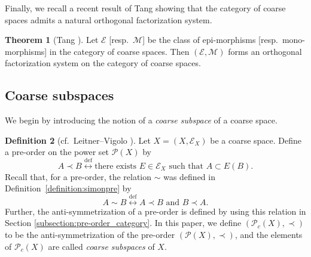 \documentclass[12pt, a4paper]{amsart}
\theoremstyle{definition}
\newtheorem{theorem}{Theorem}[section]
\newtheorem{definition}[theorem]{Definition}
\newcommand{\defarrow}{\mathrel{\stackrel{\mathrm{def}}{\longleftrightarrow}}}
\begin{document}
Finally, we recall a recent result of Tang showing that the category of
coarse spaces admits a natural orthogonal factorization system.

\begin{theorem}[Tang {\cite[Theorem 1.8]{Tang2024categorical}}]\label{theorem:EM_coarse}
Let $\mathcal{E}$ [resp.~$\mathcal{M}$] be the class of epi-morphisms
[resp.~mono-morphisms] in the category of coarse spaces.
Then $(\mathcal{E},\mathcal{M})$ forms an orthogonal factorization system on
the category of coarse spaces.
\end{theorem}


\subsection{Coarse subspaces}\label{subsection:coarsesubset}

We begin by introducing the notion of a \emph{coarse subspace} of a coarse space.


\begin{definition}[cf.~Leitner--Vigolo \cite{LeitnerVigolo2023}]\label{definition:similar}
    Let $X=(X,\mathcal{E}_X)$ be a coarse space. Define a pre-order on the power set $\mathcal{P}(X)$ by
    \[
    A \prec B
    \defarrow
    \text{there exists } E\in\mathcal{E}_X \text{ such that } A\subset E(B).
    \]
    Recall that, for a pre-order, the relation $\sim$ was defined in Definition~\ref{definition:simonpre} by
    \[
    A\sim B
    \defarrow
    A\prec B \text{ and } B\prec A.
    \]
    Further, the anti-symmetrization of a pre-order is defined by using this relation in Section \ref{subsection:pre-order_category}.
    In this paper, we define $(\mathcal{P}_c(X),\prec)$ to be the anti-symmetrization of the pre-order $(\mathcal{P}(X),\prec)$, and the elements of $\mathcal{P}_c(X)$ are called \emph{coarse subspaces} of $X$.
\end{definition}
\end{document}

